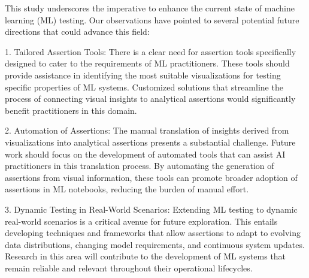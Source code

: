 \documentclass[conference]{IEEEtran}
\begin{document}
This study underscores the imperative to enhance the current state of machine learning (ML) testing. Our observations have pointed to several potential future directions that could advance this field:

1. Tailored Assertion Tools: There is a clear need for assertion tools specifically designed to cater to the requirements of ML practitioners. These tools should provide assistance in identifying the most suitable visualizations for testing specific properties of ML systems. Customized solutions that streamline the process of connecting visual insights to analytical assertions would significantly benefit practitioners in this domain.

2. Automation of Assertions: The manual translation of insights derived from visualizations into analytical assertions presents a substantial challenge. Future work should focus on the development of automated tools that can assist AI practitioners in this translation process. By automating the generation of assertions from visual information, these tools can promote broader adoption of assertions in ML notebooks, reducing the burden of manual effort.

3. Dynamic Testing in Real-World Scenarios: Extending ML testing to dynamic real-world scenarios is a critical avenue for future exploration. This entails developing techniques and frameworks that allow assertions to adapt to evolving data distributions, changing model requirements, and continuous system updates. Research in this area will contribute to the development of ML systems that remain reliable and relevant throughout their operational lifecycles.




\end{document}
